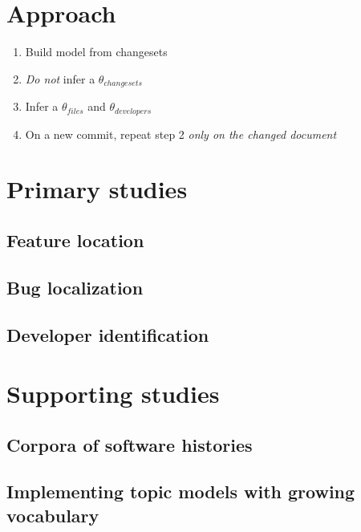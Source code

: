 \section{Approach}\label{approach}

\begin{enumerate}
\def\labelenumi{\arabic{enumi}.}
\itemsep1pt\parskip0pt
\item
  Build model from changesets
\item
  \emph{Do not} infer a $\theta_{changesets}$
\item
  Infer a $\theta_{files}$ and $\theta_{developers}$
\item
  On a new commit, repeat step 2 \emph{only on the changed document}
\end{enumerate}

\section{Primary studies}\label{primary-studies}

\subsection{Feature location}\label{feature-location-study}

\subsection{Bug localization}\label{bug-localization-study}

\subsection{Developer
identification}\label{developer-identification-study}

\section{Supporting studies}\label{supporting-studies}

\subsection{Corpora of software
histories}\label{corpora-of-software-histories}

\subsection{Implementing topic models with growing
vocabulary}\label{implementing-topic-models-with-growing-vocabulary}
